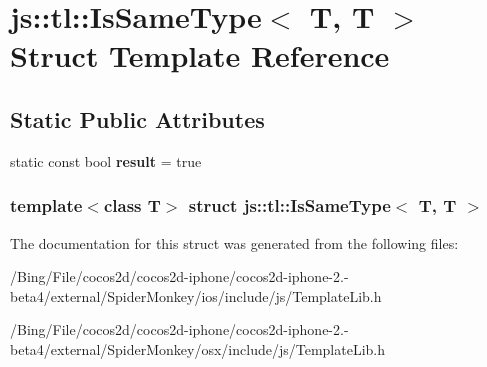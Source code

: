 \hypertarget{structjs_1_1tl_1_1_is_same_type_3_01_t_00_01_t_01_4}{\section{js\-:\-:tl\-:\-:Is\-Same\-Type$<$ T, T $>$ Struct Template Reference}
\label{structjs_1_1tl_1_1_is_same_type_3_01_t_00_01_t_01_4}
}
\subsection*{Static Public Attributes}
\begin{DoxyCompactItemize}
\item 
\hypertarget{structjs_1_1tl_1_1_is_same_type_3_01_t_00_01_t_01_4_a73195f368cedc7f15abe39d3ba25e933}{static const bool {\bfseries result} = true}\label{structjs_1_1tl_1_1_is_same_type_3_01_t_00_01_t_01_4_a73195f368cedc7f15abe39d3ba25e933}

\end{DoxyCompactItemize}
\subsubsection*{template$<$class T$>$ struct js\-::tl\-::\-Is\-Same\-Type$<$ T, T $>$}



The documentation for this struct was generated from the following files\-:\begin{DoxyCompactItemize}
\item 
/\-Bing/\-File/cocos2d/cocos2d-\/iphone/cocos2d-\/iphone-\/2.-\/beta4/external/\-Spider\-Monkey/ios/include/js/Template\-Lib.\-h\item 
/\-Bing/\-File/cocos2d/cocos2d-\/iphone/cocos2d-\/iphone-\/2.-\/beta4/external/\-Spider\-Monkey/osx/include/js/Template\-Lib.\-h\end{DoxyCompactItemize}
